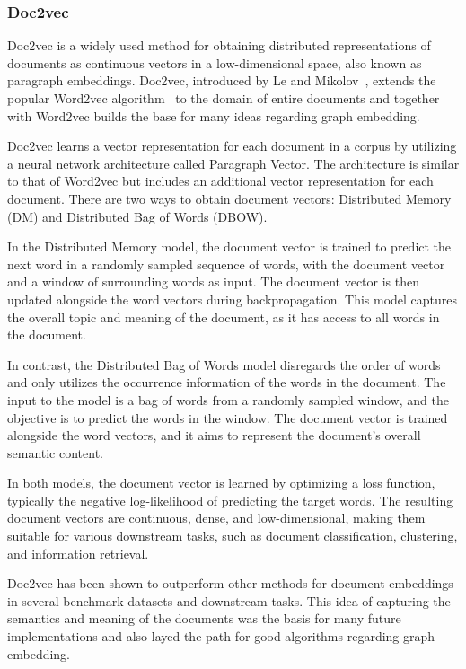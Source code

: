\subsubsection{Doc2vec}
Doc2vec is a widely used method for obtaining distributed representations of documents as continuous vectors in a low-dimensional space, also known as paragraph embeddings. Doc2vec, introduced by Le and Mikolov~\cite{2014doc2vec}, extends the popular Word2vec algorithm~\cite{mikolov2013distributed} to the domain of entire documents and together with Word2vec builds the base for many ideas regarding graph embedding.

Doc2vec learns a vector representation for each document in a corpus by utilizing a neural network architecture called Paragraph Vector. The architecture is similar to that of Word2vec but includes an additional vector representation for each document. There are two ways to obtain document vectors: Distributed Memory (DM) and Distributed Bag of Words (DBOW).

In the Distributed Memory model, the document vector is trained to predict the next word in a randomly sampled sequence of words, with the document vector and a window of surrounding words as input. The document vector is then updated alongside the word vectors during backpropagation. This model captures the overall topic and meaning of the document, as it has access to all words in the document.

In contrast, the Distributed Bag of Words model disregards the order of words and only utilizes the occurrence information of the words in the document. The input to the model is a bag of words from a randomly sampled window, and the objective is to predict the words in the window. The document vector is trained alongside the word vectors, and it aims to represent the document's overall semantic content.

In both models, the document vector is learned by optimizing a loss function, typically the negative log-likelihood of predicting the target words. The resulting document vectors are continuous, dense, and low-dimensional, making them suitable for various downstream tasks, such as document classification, clustering, and information retrieval.

Doc2vec has been shown to outperform other methods for document embeddings in several benchmark datasets and downstream tasks. This idea of capturing the semantics and meaning of the documents was the basis for many future implementations and also layed the path for good algorithms regarding graph embedding.

